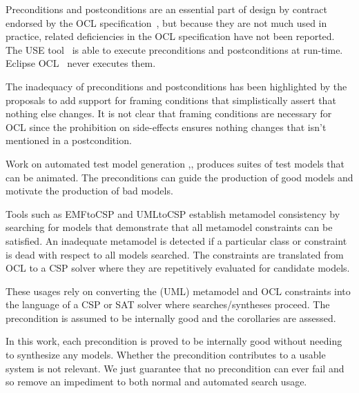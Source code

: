 \documentclass[
]{ceurart}
\begin{document}
Preconditions and postconditions are an essential part of design by contract endorsed by the OCL specification~\cite{OCL-2.4}, but because they are not much used in practice, related deficiencies in the OCL specification have not been reported. The USE tool~\cite{USE} is able to execute preconditions and postconditions at run-time. Eclipse OCL~\cite{Eclipse-OCL} never executes them.

The inadequacy of preconditions and postconditions has been highlighted by the proposals to add support for framing conditions \cite{Framing} that simplistically assert that nothing else changes. It is not clear that framing conditions are necessary for OCL since the prohibition on side-effects ensures nothing changes that isn't mentioned in a postcondition.  

Work on automated test model generation \cite{Brucker},\cite{Francisco},\cite{Gogolla} produces suites of test models that can be animated. The preconditions can guide the production of good models and motivate the production of bad models.

Tools such as EMFtoCSP \cite{EMFtoCSP} and UMLtoCSP establish metamodel consistency by searching for models that demonstrate that all metamodel constraints can be satisfied. An inadequate metamodel is detected if a particular class or constraint is dead with respect to all models searched. The constraints are translated from OCL to a CSP solver where they are repetitively evaluated for candidate models. 

These usages rely on converting the (UML) metamodel and OCL constraints into the language of a CSP or SAT solver where searches/syntheses proceed. The precondition is assumed to be internally good and the corollaries are assessed.

In this work, each precondition is proved to be internally good without needing to synthesize any models. Whether the precondition contributes to a usable system is not relevant. We just guarantee that no precondition can ever fail and so remove an impediment to both normal and automated search usage.


\end{document}
